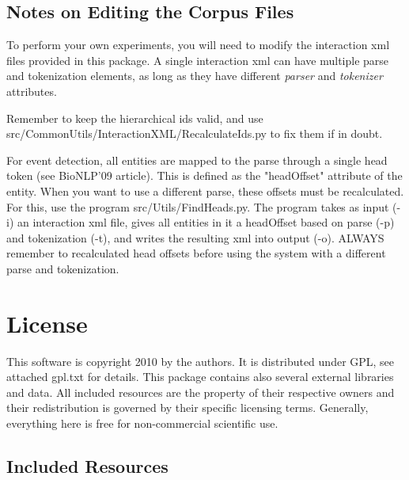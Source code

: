 \documentclass[a4paper,12pt]{article}
\begin{document}
\subsection{Notes on Editing the Corpus Files}
\label{sec-editing}

To perform your own experiments, you will need to modify the interaction xml
files provided in this package. A single interaction xml can have multiple parse
and tokenization elements, as long as they have different \emph{parser} and
\emph{tokenizer} attributes.

Remember to keep the hierarchical ids valid, and use
src/CommonUtils/InteractionXML/RecalculateIds.py to fix them if in doubt.

For event detection, all entities are mapped to the parse through a single head
token (see BioNLP'09 article). This is defined as the "headOffset" attribute of
the entity. When you want to use a different parse, these offsets must be
recalculated. For this, use the program src/Utils/FindHeads.py. The program takes
as input (-i) an interaction xml file, gives all entities in it a headOffset
based on parse (-p) and tokenization (-t), and writes the resulting xml into
output (-o). ALWAYS remember to recalculated head offsets before using the
system with a different parse and tokenization.

\section{License}

This software is copyright 2010 by the authors. It is distributed under GPL, see
attached gpl.txt for details. This package contains also several external
libraries and data. All included resources are the property of their respective
owners and their redistribution is governed by their specific licensing terms.
Generally, everything here is free for non-commercial scientific use.

\subsection{Included Resources}
\end{document}
